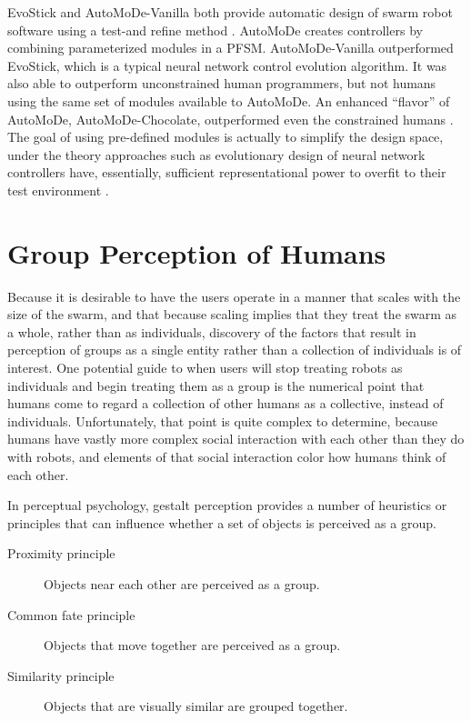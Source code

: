 EvoStick and AutoMoDe-Vanilla both provide automatic design of swarm robot software using a test-and refine method \citep{francesca2014experiment}. 
AutoMoDe creates controllers by combining parameterized modules in a PFSM. 
AutoMoDe-Vanilla outperformed EvoStick, which is a typical neural network control evolution algorithm.
It was also able to outperform unconstrained human programmers, but not humans using the same set of modules available to AutoMoDe. 
An enhanced ``flavor'' of AutoMoDe, AutoMoDe-Chocolate, outperformed even the constrained humans \citep{francesca2015automode}. 
The goal of using pre-defined modules is actually to simplify the design space, under the theory approaches such as evolutionary design of neural network controllers have, essentially, sufficient representational power to overfit to their test environment \citep{birattari2016observing}.

\section{Group Perception of Humans} \label{section:Group_Perception_of_Humans}

Because it is desirable to have the users operate in a manner that scales with the size of the swarm, and that because scaling implies that they treat the swarm as a whole, rather than as individuals, discovery of the factors that result in perception of groups as a single entity rather than a collection of individuals is of interest.
One potential guide to when users will stop treating robots as individuals and begin treating them as a group is the numerical point that humans come to regard a collection of other humans as a collective, instead of individuals. 
Unfortunately, that point is quite complex to determine, because humans have vastly more complex social interaction with each other than they do with robots, and elements of that social interaction color how humans think of each other. 

In perceptual psychology, gestalt perception provides a number of heuristics or principles that can influence whether a set of objects is perceived as a group. 
\begin{description}
\item[Proximity principle]
Objects near each other are perceived as a group.

\item[Common fate principle] 
Objects that move together are perceived as a group.

\item[Similarity principle]
Objects that are visually similar are grouped together.
\end{description}	

